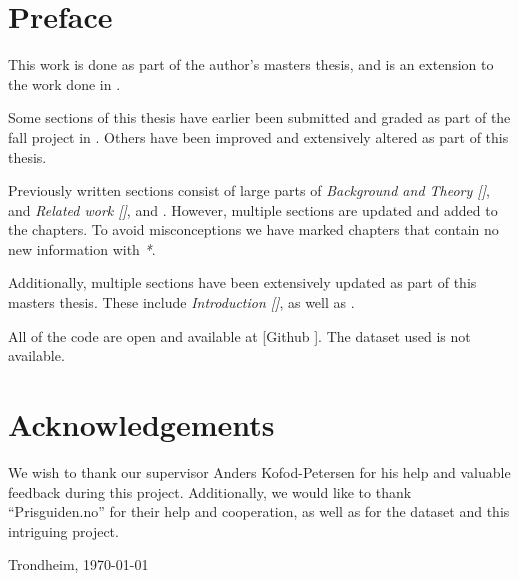 \section*{Preface}



\vspace{1cm}

This work is done as part of the author's masters thesis,
and is an extension to the work done in \cite{Sivertsen2021}.

Some sections of this thesis have earlier been submitted and graded
as part of the fall project in \cite{Sivertsen2021}.
Others have been improved and extensively altered as part of this thesis.

Previously written sections consist of large parts of \textit{Background and Theory []},
and \textit{Related work []}, and .
However, multiple sections are updated and added to the chapters.
To avoid misconceptions we have marked chapters that contain no new
information with \textit{*}.

Additionally, multiple sections have been extensively updated as part of this masters thesis.
These include \textit{Introduction []}, as well as .


All of the code are open and available at [Github \cite{githubSource}]. The dataset used is not available.


\section*{Acknowledgements}
We wish to thank our supervisor Anders Kofod-Petersen for his help and valuable feedback during this project.
Additionally, we would like to thank ``Prisguiden.no'' for their help and cooperation,
as well as for the dataset and this intriguing project.


\vfill

\hfill \thesisAuthor

\hfill Trondheim, \today